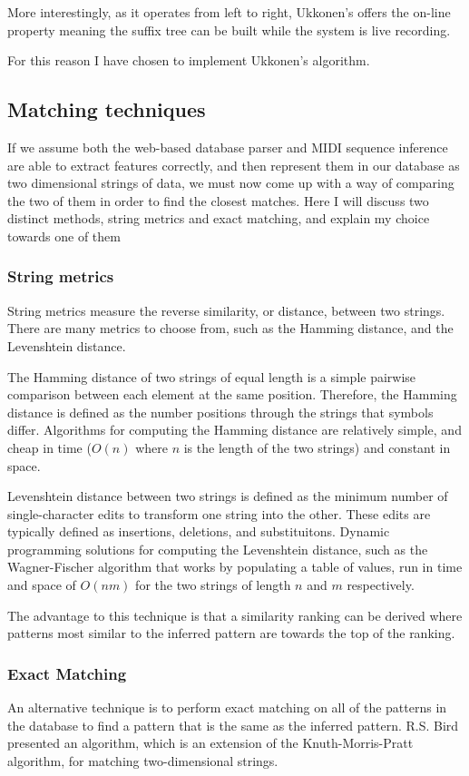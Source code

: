 \documentclass[12pt,twoside,notitlepage]{report}
\begin{document}
			More interestingly, as it operates from left to right, Ukkonen's offers the on-line property meaning the suffix tree can be built while the system is live recording.
			
	  		For this reason I have chosen to implement Ukkonen's algorithm.
		\subsection{Matching techniques}\label{subsec:Matching Techniques}

		If we assume both the web-based database parser and MIDI sequence inference are able to extract features correctly, and then represent them in our database as two dimensional strings of data, we must now come up with a way of comparing the two of them	in order to find the closest matches. Here I will discuss two distinct methods, string metrics and exact matching, and explain my choice towards one of them 
			\subsubsection{String metrics}
			String metrics measure the reverse similarity, or distance, between two strings. There are many metrics to choose from, such as the Hamming distance\cite{Hamming1950}, and the Levenshtein distance\cite{Levenshtein1966}.

			The Hamming distance of two strings of equal length is a simple pairwise comparison between each element at the same position. Therefore, the Hamming distance is defined as the number positions through the strings that symbols differ.	Algorithms for computing the Hamming distance are relatively simple, and cheap in time ($O(n)$ where $n$ is the length of the two strings) and constant in space.
			
			Levenshtein distance between two strings is defined as the minimum number of single-character edits to transform one string into the other. These edits are typically defined as insertions, deletions, and substituitons. Dynamic programming solutions for computing the Levenshtein distance, such as the Wagner-Fischer algorithm\cite{WagnerFischer1974} that works by populating a table of values, run in time and space of $O(nm)$ for the two strings of length $n$ and $m$ respectively.			
			
			The advantage to this technique is that a similarity ranking can be derived where patterns most similar to the inferred pattern are towards the top of the ranking. 
			\subsubsection{Exact Matching}
			An alternative technique is to perform exact matching on all of the patterns in the database to find a pattern that is the same as the inferred pattern. R.S. Bird presented an algorithm\cite{Bird1977}, which is an extension of the Knuth-Morris-Pratt algorithm\cite{KnuthMorrisPratt1977}, for matching two-dimensional strings.
			
\end{document}
